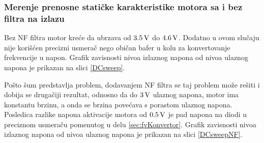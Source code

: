 \documentclass[a4paper, 12pt, diplomski]{etf}
\renewcommand{\unit}[1]{\,{\rm #1}}   %
\begin{document}
\subsubsection{Merenje prenosne statičke karakteristike motora sa i bez filtra na izlazu}

Bez NF filtra motor kreće da ubrzava od $3.5 \unit{V}$ do $4.6 \unit{V}$. Dodatno u ovom slučaju nije korišćen precizni usmerač nego običan bafer u kolu za konvertovanje frekvencije u napon. Grafik zavisnosti nivoa izlaznog napona od nivoa ulaznog napona je prikazan na slici \ref{DCsweep}.


Pošto šum predstavlja problem, dodavanjem NF filtra se taj problem može rešiti i dobija se drugačiji rezultat, odnosno da do $3 \unit{V}$ ulaznog napona, motor ima konstantu brzinu, a onda se brzina povećava s porastom ulaznog napona. Posledica razlike napona aktivacije motora od $0.5 \unit{V}$ je pad napona na diodi u preciznom usmeraču pomenutog u delu \ref{sec:fvKonvertor}. Grafik zavisnosti nivoa izlaznog napona od nivoa ulaznog napona je prikazan na slici \ref{DCsweepNF}.
\end{document}
